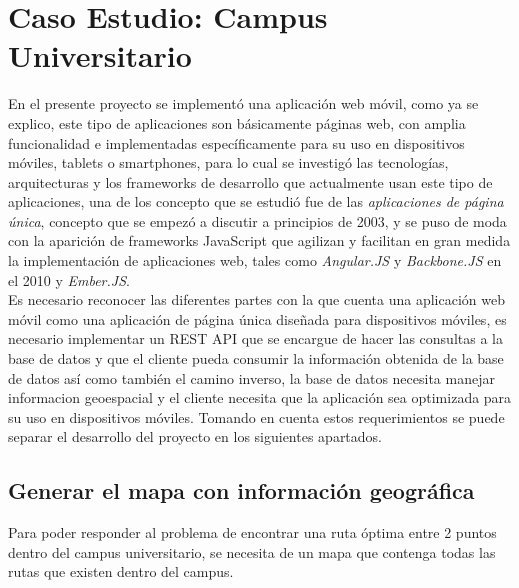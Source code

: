 \chapter{Caso Estudio: Campus Universitario}
\label{chap:Caso Estudio: Campus Universitario}


En el presente proyecto se implementó una aplicación web móvil, como ya se explico, este tipo de aplicaciones son básicamente páginas web, con amplia funcionalidad e implementadas específicamente para su uso en dispositivos móviles, tablets o smartphones, para lo cual se investigó las tecnologías, arquitecturas y los frameworks de desarrollo que actualmente usan este tipo de aplicaciones, una de los concepto que se estudió fue de las \emph{aplicaciones de página única}, concepto que se empezó a discutir a principios de 2003, y se puso de moda con la aparición de frameworks JavaScript que agilizan y facilitan en gran medida la implementación de aplicaciones web, tales como  \emph{Angular.JS} y \emph{Backbone.JS} en el 2010 y \emph{Ember.JS}. \\

Es necesario reconocer las diferentes partes con la que cuenta una aplicación web móvil como una aplicación de página única diseñada para dispositivos móviles, es necesario implementar un REST API que se encargue de hacer las consultas a la base de datos y que el cliente pueda consumir la información obtenida de la base de datos así como también el camino inverso, la base de datos necesita manejar informacion geoespacial y el cliente necesita que la aplicación sea optimizada para su uso en dispositivos móviles. Tomando en cuenta estos requerimientos se puede separar el desarrollo del proyecto en los siguientes apartados. \\



\section{Generar el mapa con información geográfica}
\label{sec:generar_mapa_rutas}

Para poder responder al problema de encontrar una ruta óptima entre 2 puntos dentro del campus universitario, se necesita de un mapa que contenga todas las rutas que existen dentro del campus.\\


